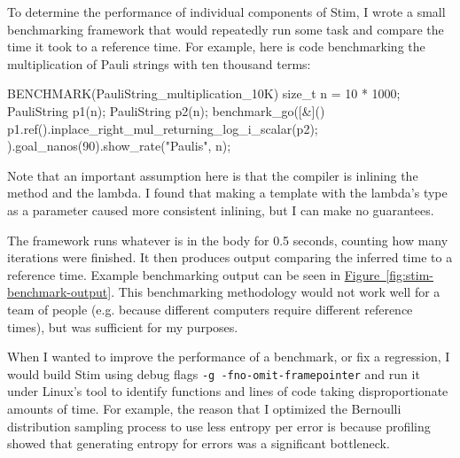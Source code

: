 \documentclass[onecolumn,unpublished]{quantumarticle}
\theoremstyle{definition}
\theoremstyle{definition}
\theoremstyle{definition}
\newcommand{\fig}[1]{\hyperref[fig:#1]{Figure~\ref*{fig:#1}}}
\begin{document}
To determine the performance of individual components of Stim, I wrote a small benchmarking framework that would repeatedly run some task and compare the time it took to a reference time.
For example, here is code benchmarking the multiplication of Pauli strings with ten thousand terms:

\begin{cpp}
    BENCHMARK(PauliString_multiplication_10K) {
        size_t n = 10 * 1000;
        PauliString p1(n);
        PauliString p2(n);
        benchmark_go([&]() {
            p1.ref().inplace_right_mul_returning_log_i_scalar(p2);
        }).goal_nanos(90).show_rate("Paulis", n);
    }
\end{cpp}

Note that an important assumption here is that the compiler is inlining the  method and the lambda.
I found that making  a template with the lambda's type as a parameter caused more consistent inlining, but I can make no guarantees.

The framework runs whatever is in the  body for 0.5 seconds, counting how many iterations were finished.
It then produces output comparing the inferred time to a reference time.
Example benchmarking output can be seen in \fig{stim-benchmark-output}.
This benchmarking methodology would not work well for a team of people (e.g. because different computers require different reference times), but was sufficient for my purposes.

When I wanted to improve the performance of a benchmark, or fix a regression, I would build Stim using debug flags \texttt{-g -fno-omit-framepointer} and run it under Linux's  tool to identify functions and lines of code taking disproportionate amounts of time.
For example, the reason that I optimized the Bernoulli distribution sampling process to use less entropy per error is because profiling showed that generating entropy for errors was a significant bottleneck.
\end{document}
